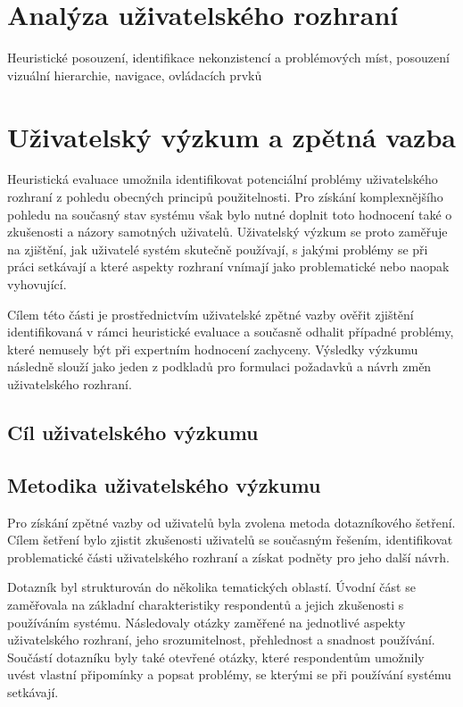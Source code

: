 \section{Analýza uživatelského rozhraní}
Heuristické posouzení, identifikace nekonzistencí a problémových míst, posouzení vizuální hierarchie, navigace, ovládacích prvků

\section{Uživatelský výzkum a zpětná vazba}
Heuristická evaluace umožnila identifikovat potenciální problémy uživatelského rozhraní z pohledu obecných principů použitelnosti. Pro získání komplexnějšího pohledu na současný stav systému však bylo nutné doplnit toto hodnocení také o zkušenosti a názory samotných uživatelů. Uživatelský výzkum se proto zaměřuje na zjištění, jak uživatelé systém skutečně používají, s jakými problémy se při práci setkávají a které aspekty rozhraní vnímají jako problematické nebo naopak vyhovující.

Cílem této části je prostřednictvím uživatelské zpětné vazby ověřit zjištění identifikovaná v rámci heuristické evaluace a současně odhalit případné problémy, které nemusely být při expertním hodnocení zachyceny. Výsledky výzkumu následně slouží jako jeden z podkladů pro formulaci požadavků a návrh změn uživatelského rozhraní.

\subsection{Cíl uživatelského výzkumu}

\subsection{Metodika uživatelského výzkumu}

Pro získání zpětné vazby od uživatelů byla zvolena metoda dotazníkového šetření. Cílem šetření bylo zjistit zkušenosti uživatelů se současným řešením, identifikovat problematické části uživatelského rozhraní a získat podněty pro jeho další návrh.

Dotazník byl strukturován do několika tematických oblastí. Úvodní část se zaměřovala na základní charakteristiky respondentů a jejich zkušenosti s používáním systému. Následovaly otázky zaměřené na jednotlivé aspekty uživatelského rozhraní, jeho srozumitelnost, přehlednost a snadnost používání. Součástí dotazníku byly také otevřené otázky, které respondentům umožnily uvést vlastní připomínky a popsat problémy, se kterými se při používání systému setkávají.

